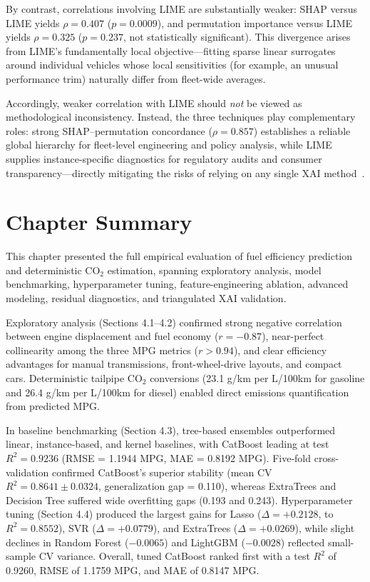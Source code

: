 By contrast, correlations involving LIME are substantially weaker: SHAP versus LIME yields \(\rho = 0.407\) (\(p = 0.0009\)), and permutation importance versus LIME yields \(\rho = 0.325\) (\(p = 0.237\), not statistically significant). This divergence arises from LIME's fundamentally local objective---fitting sparse linear surrogates around individual vehicles whose local sensitivities (for example, an unusual performance trim) naturally differ from fleet-wide averages.

Accordingly, weaker correlation with LIME should \emph{not} be viewed as methodological inconsistency. Instead, the three techniques play complementary roles: strong SHAP--permutation concordance (\(\rho = 0.857\)) establishes a reliable global hierarchy for fleet-level engineering and policy analysis, while LIME supplies instance-specific diagnostics for regulatory audits and consumer transparency---directly mitigating the risks of relying on any single XAI method~\cite{mangalathu2020failure}.


\section{Chapter Summary}

This chapter presented the full empirical evaluation of fuel efficiency prediction and deterministic \(\mathrm{CO_2}\) estimation, spanning exploratory analysis, model benchmarking, hyperparameter tuning, feature-engineering ablation, advanced modeling, residual diagnostics, and triangulated XAI validation.

Exploratory analysis (Sections 4.1--4.2) confirmed strong negative correlation between engine displacement and fuel economy (\(r = -0.87\)), near-perfect collinearity among the three MPG metrics (\(r > 0.94\)), and clear efficiency advantages for manual transmissions, front-wheel-drive layouts, and compact cars. Deterministic tailpipe \(\mathrm{CO_2}\) conversions (23.1 g/km per L/100km for gasoline and 26.4 g/km per L/100km for diesel) enabled direct emissions quantification from predicted MPG.

In baseline benchmarking (Section 4.3), tree-based ensembles outperformed linear, instance-based, and kernel baselines, with CatBoost leading at test \(R^2 = 0.9236\) (RMSE = 1.1944 MPG, MAE = 0.8192 MPG). Five-fold cross-validation confirmed CatBoost's superior stability (mean CV \(R^2 = 0.8641 \pm 0.0324\), generalization gap = 0.110), whereas ExtraTrees and Decision Tree suffered wide overfitting gaps (0.193 and 0.243). Hyperparameter tuning (Section 4.4) produced the largest gains for Lasso (\(\Delta = +0.2128\), to \(R^2 = 0.8552\)), SVR (\(\Delta = +0.0779\)), and ExtraTrees (\(\Delta = +0.0269\)), while slight declines in Random Forest (\(-0.0065\)) and LightGBM (\(-0.0028\)) reflected small-sample CV variance. Overall, tuned CatBoost ranked first with a test \(R^2\) of 0.9260, RMSE of 1.1759 MPG, and MAE of 0.8147 MPG.

